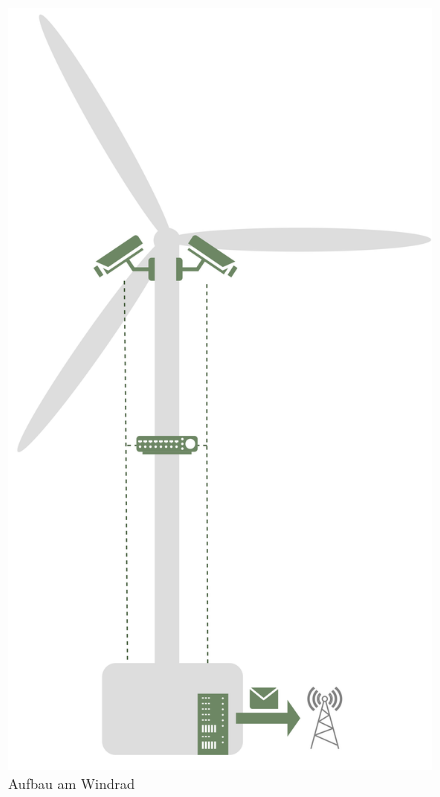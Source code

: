 \begin{figure}[ht]
    \begin{small}
        \begin{center}
            \includegraphics[height=0.5\textheight]{figures/architecture/windrad.png}
        \end{center}
        \caption{Aufbau am Windrad}
        \label{ch4:fig:windrad}
    \end{small}
\end{figure}

